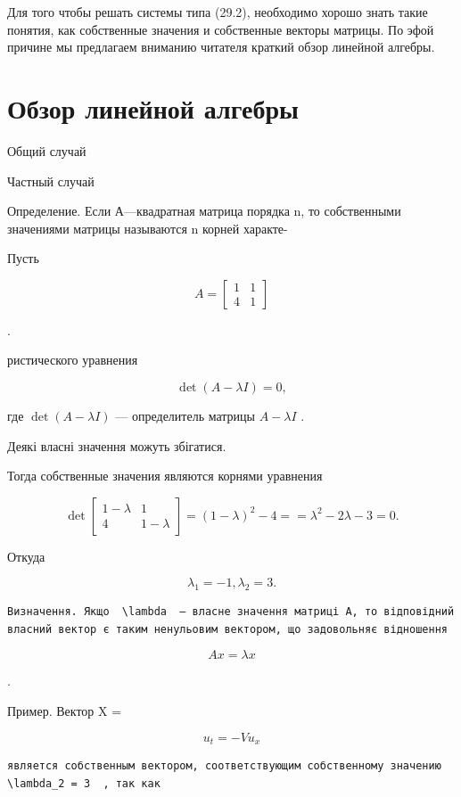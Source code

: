 \documentclass[
  ukrainian,
]{article}
\begin{document}
Для того чтобы решать системы типа (29.2), необходимо хорошо знать такие
понятия, как собственные значения и собственные векторы матрицы. По эфой
причине мы предлагаем вниманию читателя краткий обзор линейной алгебры.

\section{Обзор линейной
алгебры}\label{ux43eux431ux437ux43eux440-ux43bux438ux43dux435ux439ux43dux43eux439-ux430ux43bux433ux435ux431ux440ux44b}

Общий случай

Частный случай

Определение. Если А---квадратная матрица порядка n, то собственными
значениями матрицы называются n корней характе-

Пусть

\[
A =
\begin{bmatrix} 1 & 1 \\ 4 & 1 \end{bmatrix}
\]

.

ристического уравнения

\[
\det\left(A-\lambda I\right)=0,
\]

где \(\det(A-\lambda I)\) --- определитель матрицы \(A-\lambda I\) .

Деякі власні значення можуть збігатися.

Тогда собственные значения являются корнями уравнения

\[
\det
\begin{bmatrix} 1-\lambda & 1\\ 4 & 1-\lambda \end{bmatrix}
= (1-\lambda)^2 - 4 =
= \lambda^2 - 2\lambda - 3 = 0.
\]

Откуда

\[
\lambda_1 = -1
,  \lambda_2 = 3  .
\]

\begin{verbatim}
Визначення. Якщо  \lambda  — власне значення матриці A, то відповідний власний вектор є таким ненульовим вектором, що задовольняє відношення
\end{verbatim}

\[
Ax = \lambda x
\]

.

Пример. Вектор X =

\[
u_t = -Vu_x
\]

\begin{verbatim}
является собственным вектором, соответствующим собственному значению  \lambda_2 = 3  , так как
\end{verbatim}
\end{document}
